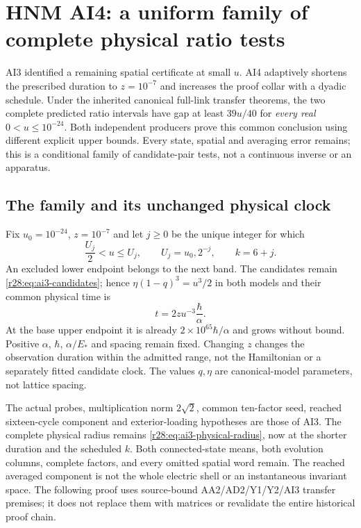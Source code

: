 \section{HNM AI4: a uniform family of complete physical ratio tests\workstar}
AI3 identified a remaining spatial certificate at small $u$. AI4 adaptively shortens the prescribed duration to $z=10^{-7}$ and increases the proof collar with a dyadic schedule. Under the inherited canonical full-link transfer theorems, the two complete predicted ratio intervals have gap at least $39u/40$ for \emph{every real} $0<u\le10^{-24}$. Both independent producers prove this common conclusion using different explicit upper bounds. Every state, spatial and averaging error remains; this is a conditional family of candidate-pair tests, not a continuous inverse or an apparatus.

\subsection{The family and its unchanged physical clock}
Fix $u_0=10^{-24}$, $z=10^{-7}$ and let $j\ge0$ be the unique integer for which
\begin{equation}
 \frac{U_j}{2}<u\le U_j,\qquad U_j=u_0,2^{-j},\qquad k=6+j.
 \label{r28:eq:ai4-bands}
\end{equation}
An excluded lower endpoint belongs to the next band. The candidates remain \eqref{r28:eq:ai3-candidates}; hence $\eta(1-q)^3=u^3/2$ in both models and their common physical time is
\begin{equation}
 t=2zu^{-3}\frac{\hbar}{\alpha}.
 \label{r28:eq:ai4-clock}
\end{equation}
At the base upper endpoint it is already $2\times10^{65}\hbar/\alpha$ and grows without bound. Positive $\alpha$, $\hbar$, $\alpha/E_*$ and spacing remain fixed. Changing $z$ changes the observation duration within the admitted range, not the Hamiltonian or a separately fitted candidate clock. The values $q,\eta$ are canonical-model parameters, not lattice spacing.

The actual probes, multiplication norm $2\sqrt2$, common ten-factor seed, reached sixteen-cycle component and exterior-loading hypotheses are those of AI3. The complete physical radius remains \eqref{r28:eq:ai3-physical-radius}, now at the shorter duration and the scheduled $k$. Both connected-state means, both evolution columns, complete factors, and every omitted spatial word remain. The reached averaged component is not the whole electric shell or an instantaneous invariant space. The following proof uses source-bound AA2/AD2/Y1/Y2/AI3 transfer premises; it does not replace them with matrices or revalidate the entire historical proof chain.

